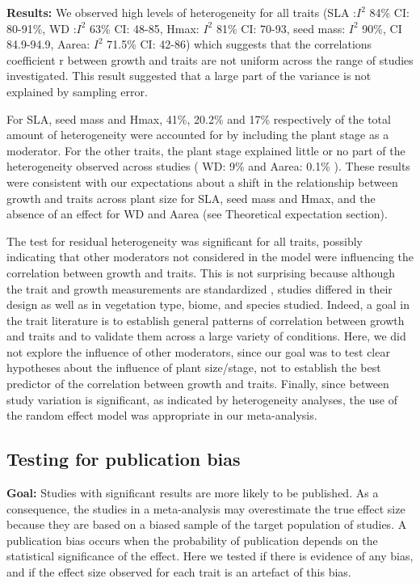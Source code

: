 \noindent\textbf{Results:} We observed high levels of heterogeneity for all traits (SLA :$I^{2}$ 84\% CI: 80-91\%, WD :$I^{2}$ 63\% CI: 48-85, Hmax: $I^{2}$ 81\% CI: 70-93, seed mass: $I^{2}$ 90\%, CI 84.9-94.9, Aarea: $I^{2}$ 71.5\% CI: 42-86) which suggests that the correlations coefficient r between growth and traits are not uniform across the range of studies investigated. This result suggested that a large part of the variance is not explained by sampling error.

For SLA, seed mass and Hmax, 41\%, 20.2\% and 17\% respectively of the total amount of heterogeneity were accounted for by including the plant stage as a moderator. For the other traits, the plant stage explained little or no part of the heterogeneity observed across studies ( WD: 9\% and Aarea: 0.1\% ). These results were consistent with our expectations about a shift in the relationship between growth and traits across plant size for SLA, seed mass and Hmax, and the absence of an effect for WD and Aarea (see Theoretical expectation section). 

The test for residual heterogeneity was significant for all traits, possibly indicating that other moderators not considered in the model were influencing the correlation between growth and traits. This is not surprising because although the trait and growth measurements are standardized \citep{Cornelissen:2003gw}, studies differed in their design as well as in vegetation type, biome, and species studied. Indeed, a goal in the trait literature is to establish general patterns of correlation between growth and traits and to validate them across a large variety of conditions. Here, we did not explore the influence of other moderators, since our goal was to test clear hypotheses about the influence of plant size/stage, not to establish the best predictor of the correlation between growth and traits. Finally, since between study variation is significant, as indicated by heterogeneity analyses, the use of the random effect model was appropriate in our meta-analysis.
\clearpage

\subsection{Testing for publication bias}
\noindent\textbf{Goal:} Studies with significant results are more likely to be published. As a consequence, the studies in a meta-analysis may overestimate the true effect size because they are based on a biased sample of the target population of studies. A publication bias occurs when the probability of publication depends on the statistical significance of the effect. Here we tested if there is evidence of any bias, and if the effect size observed for each trait is an artefact of this bias.

